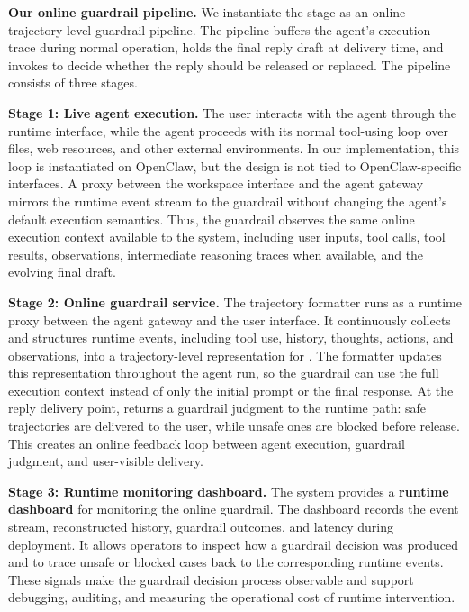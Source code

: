 
\textbf{Our online guardrail pipeline.} We instantiate the \prereply{} stage as an online trajectory-level guardrail pipeline. The pipeline buffers the agent's execution trace during normal operation, holds the final reply draft at delivery time, and invokes \agentdog{} to decide whether the reply should be released or replaced. The pipeline consists of three stages.

\textbf{Stage 1: Live agent execution.} The user interacts with the agent through the runtime interface, while the agent proceeds with its normal tool-using loop over files, web resources, and other external environments. In our implementation, this loop is instantiated on OpenClaw, but the design is not tied to OpenClaw-specific interfaces. A proxy between the workspace interface and the agent gateway mirrors the runtime event stream to the guardrail without changing the agent's default execution semantics. Thus, the guardrail observes the same online execution context available to the system, including user inputs, tool calls, tool results, observations, intermediate reasoning traces when available, and the evolving final draft.


\textbf{Stage 2: Online guardrail service.} The trajectory formatter runs as a runtime proxy between the agent gateway and the user interface. It continuously collects and structures runtime events, including tool use, history, thoughts, actions, and observations, into a trajectory-level representation for \agentdog{}. The formatter updates this representation throughout the agent run, so the guardrail can use the full execution context instead of only the initial prompt or the final response. At the reply delivery point, \agentdog{} returns a guardrail judgment to the runtime path: safe trajectories are delivered to the user, while unsafe ones are blocked before release. This creates an online feedback loop between agent execution, guardrail judgment, and user-visible delivery.


\textbf{Stage 3: Runtime monitoring dashboard.} The system provides a \textbf{runtime dashboard} for monitoring the online guardrail. The dashboard records the event stream, reconstructed history, guardrail outcomes, and latency during deployment. It allows operators to inspect how a guardrail decision was produced and to trace unsafe or blocked cases back to the corresponding runtime events. These signals make the guardrail decision process observable and support debugging, auditing, and measuring the operational cost of runtime intervention.


